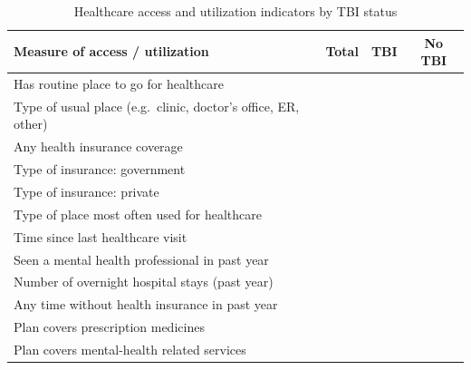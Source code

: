 \documentclass{article}
\begin{document}
\begin{table}[htbp]
\centering
\caption{Healthcare access and utilization indicators by TBI status}
\label{tab:access-tbi}
\begin{tabular}{lccc}
\hline
\textbf{Measure of access / utilization} & \textbf{Total} & \textbf{TBI} & \textbf{No TBI} \\
\hline
Has routine place to go for healthcare & & & \\
Type of usual place (e.g.\ clinic, doctor's office, ER, other) & & & \\
Any health insurance coverage & & & \\
Type of insurance: government & & & \\
Type of insurance: private & & & \\
Type of place most often used for healthcare & & & \\
Time since last healthcare visit & & & \\
Seen a mental health professional in past year & & & \\
Number of overnight hospital stays (past year) & & & \\
Any time without health insurance in past year & & & \\
Plan covers prescription medicines & & & \\
Plan covers mental-health related services & & & \\
\hline
\end{tabular}
\end{table}
\end{document}
